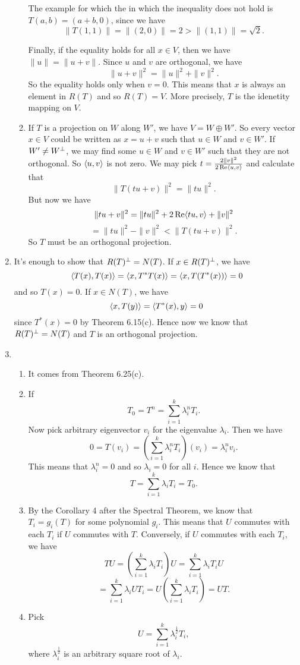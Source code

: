 \begin{enumerate}
\begin{enumerate}
The example for which the in which the inequality does not hold is $T(a,b)=(a+b,0)$, since we have 
\[\|T(1,1)\|=\|(2,0)\|=2> \|(1,1)\|=\sqrt{2}.\]

Finally, if the equality holds for all $x\in V$, then we have $\|u\|=\|u+v\|$. Since $u$ and $v$ are orthogonal, we have 
\[\|u+v\|^2=\|u\|^2+\|v\|^2.\]
So the equality holds only when $v=0$. This means that $x$ is always an element in $R(T)$ and so $R(T)=V$. More precisely, $T$ is the idenetity mapping on $V$.
\item If $T$ is a projection on $W$ along $W'$, we have $V=W\oplus W'$. So every vector $x\in V$ could be written as $x=u+v$ such that $u\in W$ and $v\in W'$. If $W'\neq W^{\perp}$, we may find some $u\in W$ and $v\in W'$ such that they are not orthogonal. So $\langle u,v\rangle $ is not zero. We may pick $t=\frac{2\|v\|^2}{2 \operatorname{Re} \langle u,v\rangle}$ and calculate that 
\[\|T(tu+v)\|^2=\|tu\|^2.\]
But now we have 
\[\|tu+v\|^2=\|tu\|^2+2\operatorname{Re} \langle tu,v\rangle +\|v\|^2\]
\[=\|tu\|^2-\|v\|^2<\|T(tu+v)\|^2.\]
So $T$ must be an orthogonal projection.
\end{enumerate}
\item It's enough to show that $R(T)^{\perp}=N(T)$. If $x\in R(T)^{\perp}$, we have 
\[\langle T(x),T(x)\rangle =\langle x,T^*T(x)\rangle =\langle x,T(T^*(x))\rangle =0\]
and so $T(x)=0$. If $x\in N(T)$, we have 
\[\langle x,T(y)\rangle =\langle T^*(x),y\rangle =0\]
since $T^*(x)=0$ by Theorem 6.15(c). Hence now we know that $R(T)^{\perp}=N(T)$ and $T$ is an orthogonal projection.
\item \begin{enumerate}
\item It comes from Theorem 6.25(c).
\item If 
\[T_0=T^n=\sum_{i=1}^k{\lambda_i^nT_i}.\]
Now pick arbitrary eigenvector $v_i$ for the eigenvalue $\lambda_i$. Then we have 
\[0=T(v_i)=(\sum_{i=1}^k{\lambda_i^nT_i})(v_i)=\lambda_i^nv_i.\] 
This means that $\lambda_i^n=0$ and so $\lambda_i=0$ for all $i$. Hence we know that 
\[T=\sum_{i=1}^k{\lambda_iT_i}=T_0.\]
\item By the Corollary 4 after the Spectral Theorem, we know that $T_i=g_i(T)$ for some polynomial $g_i$. This means that $U$ commutes with each $T_i$ if $U$ commutes with $T$. Conversely, if $U$ commutes with each $T_i$, we have 
\[TU=(\sum_{i=1}^k{\lambda_iT_i})U=\sum_{i=1}^k{\lambda_iT_iU}\]
\[=\sum_{i=1}^k{\lambda_iUT_i}=U(\sum_{i=1}^k{\lambda_iT_i})=UT.\]
\item Pick 
\[U=\sum_{i=1}^k{\lambda_i^{\frac{1}{2}}T_i},\]
where $\lambda_i^{\frac{1}{2}}$ is an arbitrary square root of $\lambda_i$.

\end{enumerate}
\end{enumerate}
